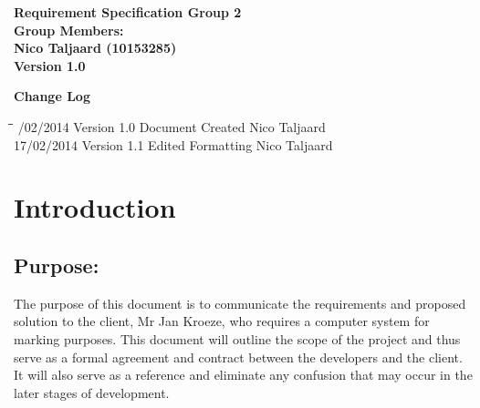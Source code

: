 \documentclass[12pt]{article}
\newcommand{\Title}{Requirement Specification} %
\begin{document}
\vspace{4em}

\begin{center}%

  \LARGE \bf \Title
  \LARGE {\bf Group 2}\\[2em]
  \LARGE {\bf Group Members:}\\[1em]
  \large
      Nico Taljaard			(10153285)\\[6em]
      
      {\bf Version 1.0}
    
\end{center}%

\newpage
	{\LARGE \bf Change Log}\\[2em]
	
	\begin{tabbing}
		\hspace*{3cm}\=\hspace*{3cm}\=\hspace*{8cm}\=\hspace*{3cm} /02/2014 \> Version 1.0 \> Document Created \> Nico Taljaard\\
		17/02/2014 \> Version 1.1 \> Edited Formatting \> Nico Taljaard\\
	\end{tabbing}

\newpage
	\tableofcontents	
	
\newpage
	\section{Introduction}
	
	\vspace{0.2in}

		\subsection{Purpose:} %
		\vspace{0.1in}
		The purpose of this document is to communicate the requirements and proposed solution to the client, Mr Jan Kroeze, who requires a computer system for marking purposes. This document will outline the scope of the project and thus serve as a formal agreement and contract between the developers and the client. It will also serve as a reference and eliminate any confusion that may occur in the later stages of development. 
	
	\vspace{0.2in}
	
\end{document}

